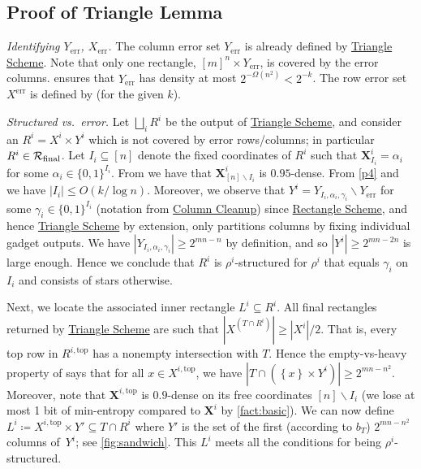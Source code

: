 \documentclass{toc}
\newcommand{\rectscheme}{\hyperref[alg:partition]{Rectangle Scheme}\xspace}
\newcommand{\trischeme}{\hyperref[alg:tri-partition]{Triangle Scheme}\xspace}
\newcommand{\columnclean}{\hyperref[alg:column-cleanup]{Column Cleanup}\xspace}
\DeclareMathOperator{\err}{err}
\newcommand{\X}{\bm{X}}
\newcommand{\calR}{\mathcal{R}}
\newcommand{\allX}{[m]^n}
\newcommand{\set}[1]{\left \{ #1 \right \}}
\newcommand{\final}{\text{\upshape final}}
\newcommand{\topp}{\text{top}}
\begin{document}
\subsection{Proof of Triangle Lemma} \label{sec:proof-trilemma}

\emph{Identifying $Y_{\err}$, $X_{\err}$.}
The column error set $Y_{\err}$ is already defined by \trischeme. Note that only one rectangle, $\allX\times Y_{\err}$, is covered by the error columns.  ensures that $Y_{\err}$ has density at most $2^{-\Omega(n^2)} < 2^{-k}$. The row error set $X^{\err}$ is defined by  (for the given $k$).

\medskip
\noindent \emph{Structured vs.\ error.}
Let $\bigsqcup_i R^i$ be the output of \trischeme, and consider an $R^i=X^i\times Y^i$ which is not covered by error rows/columns; in particular $R^i\in\calR_{\final}$. Let $I_i\subseteq[n]$ denote the fixed coordinates of $R^i$ such that $\X^i_{I_i}=\alpha_i$ for some $\alpha_i\in\{0,1\}^{I_i}$. {}From  we have that $\X^i_{[n] \smallsetminus I_i}$ is $0.95$-dense. {}From \ref{p4} and  we have $|I_i|\leq O(k/\log n)$. Moreover, we observe that $Y^i = Y_{I_i,\alpha_i,\gamma_i}\smallsetminus Y_{\err}$ for some $\gamma_i\in\{0,1\}^{I_i}$ (notation from \columnclean) since \rectscheme, and hence \trischeme by extension, only partitions columns by fixing individual gadget outputs. We have $|Y_{I_i,\alpha_i,\gamma_i}|\geq 2^{mn-n}$ by definition, and so $|Y^i|\geq 2^{mn-2n}$ is large enough. %
Hence we conclude that $R^i$ is $\rho^i$-structured for $\rho^i$ that equals $\gamma_i$ on $I_i$ and consists of stars otherwise.

Next, we locate the associated inner rectangle $L^i\subseteq R^i$. All final rectangles
returned %
by \trischeme are such that $|X^{(T \cap R^i)}| \ge |X^i|/2$. That is, every top row in $R^{i,\topp}$ has a nonempty intersection with $T$. Hence the empty-vs-heavy property of  says that for all $x\in X^{i,\topp}$, we have $|T \cap (\set{x} \times Y^i)| \ge 2^{mn-n^2}$. Moreover, note that $\X^{i,\topp}$ is $0.9$-dense on its free coordinates $[n] \smallsetminus I_i$ (we lose at most 1 bit of min-entropy compared to $\X^i$ by \autoref{fact:basic}). We can now define $L^i\coloneqq X^{i,\topp}\times Y'\subseteq T\cap R^i$ where $Y'$ is the set of the first (according to $b_T$) $2^{mn-n^2}$ columns of~$Y^i$; see \autoref{fig:sandwich}. This $L^i$ meets all the conditions for being $\rho^i$-structured.
\end{document}
